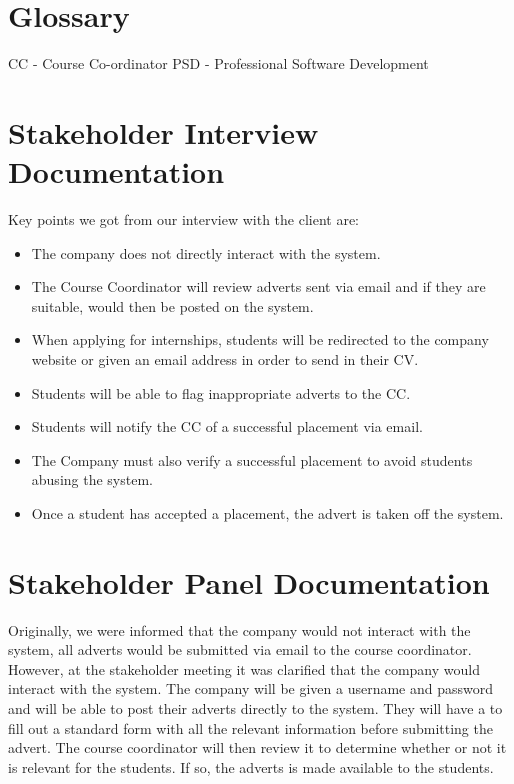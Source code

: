 \documentclass{l3deliverable}
\begin{document}
\section{Glossary}
CC - Course Co-ordinator
PSD - Professional Software Development

\section{Stakeholder Interview Documentation}

Key points we got from our interview with the client are:

\begin{itemize}
\item The company does not directly interact with the system.
\item The Course Coordinator will review adverts sent via email and if they are suitable, would
then be posted on the system.
\item When applying for internships, students will be redirected to the company website or given
an email address in order to send in their CV.
\item Students will be able to flag inappropriate adverts to the CC.
\item Students will notify the CC of a successful placement via email.
\item The Company must also verify a successful placement to avoid students abusing the
system.
\item Once a student has accepted a placement, the advert is taken off the system.
\end{itemize}

\section{Stakeholder Panel Documentation}

Originally, we were informed that the company would not interact with the system, all adverts
would be submitted via email to the course coordinator. However, at the stakeholder meeting
it was clarified that the company would interact with the system. The company will be given a
username and password and will be able to post their adverts directly to the system. They will
have a to fill out a standard form with all the relevant information before submitting the advert.
The course coordinator will then review it to determine whether or not it is relevant for the
students. If so, the adverts is made available to the students.
\end{document}

